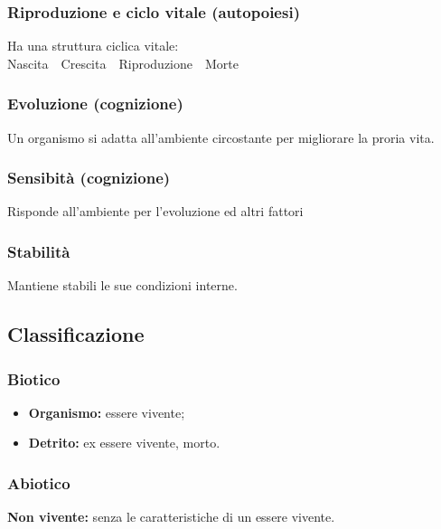 \documentclass{article}
\begin{document}
\newpage
\subsubsection{Riproduzione e ciclo vitale (autopoiesi)}
Ha una struttura ciclica vitale:\\
Nascita\ \textrightarrow\ Crescita\ \textrightarrow\ Riproduzione\ \textrightarrow\ Morte

\subsubsection{Evoluzione (cognizione)}
Un organismo si adatta all'ambiente circostante per migliorare la proria vita.

\subsubsection{Sensibità (cognizione)}
Risponde all'ambiente per l'evoluzione ed altri fattori

\subsubsection{Stabilità}
Mantiene stabili le sue condizioni interne.

\subsection{Classificazione}
\subsubsection{Biotico}
\begin{itemize}
    \item \textbf{Organismo:} essere vivente;
    \item \textbf{Detrito:} ex essere vivente, morto.
\end{itemize}

\subsubsection{Abiotico}
\textbf{Non vivente:} senza le caratteristiche di un essere vivente.
\end{document}
